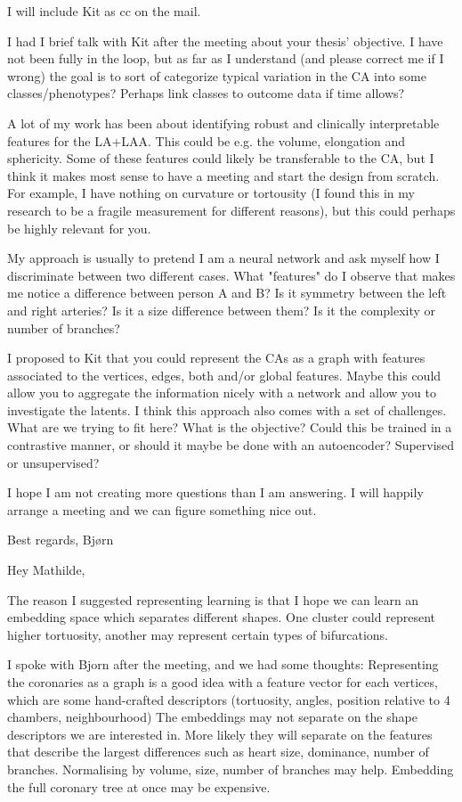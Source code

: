 I will include Kit as cc on the mail.

I had I brief talk with Kit after the meeting about your thesis' objective. I have not been fully in the loop, but as far as I understand (and please correct me if I wrong) the goal is to sort of categorize typical variation in the CA into some classes/phenotypes? Perhaps link classes to outcome data if time allows? 

A lot of my work has been about identifying robust and clinically interpretable features for the LA+LAA. This could be e.g. the volume, elongation and sphericity. Some of these features could likely be transferable to the CA, but I think it makes most sense to have a meeting and start the design from scratch. For example, I have nothing on curvature or tortousity (I found this in my research to be a fragile measurement for different reasons), but this could perhaps be highly relevant for you. 

My approach is usually to pretend I am a neural network and ask myself how I discriminate between two different cases. What "features" do I observe that makes me notice a difference between person A and B? Is it symmetry between the left and right arteries? Is it a size difference between them? Is it the complexity or number of branches? 


I proposed to Kit that you could represent the CAs as a graph with features associated to the vertices, edges, both and/or global features. Maybe this could allow you to aggregate the information nicely with a network and allow you to investigate the latents. 
I think this approach also comes with a set of challenges. What are we trying to fit here? What is the objective? Could this be trained in a contrastive manner, or should it maybe be done with an autoencoder? Supervised or unsupervised? 

I hope I am not creating more questions than I am answering. I will happily arrange a meeting and we can figure something nice out.

Best regards,
Bjørn

Hey Mathilde, 

The reason I suggested representing learning is that I hope we can learn an embedding space which separates different shapes. One cluster could represent higher tortuosity, another may represent certain types of bifurcations. 

I spoke with Bjorn after the meeting, and we had some thoughts: 
Representing the coronaries as a graph is a good idea with a feature vector for each vertices, which are some hand-crafted descriptors (tortuosity, angles, position relative to 4 chambers, neighbourhood)
The embeddings may not separate on the shape descriptors we are interested in. More likely they will separate on the features that describe the largest differences such as heart size, dominance, number of branches. 
Normalising by volume, size, number of branches may help. 
Embedding the full coronary tree at once may be expensive. 


